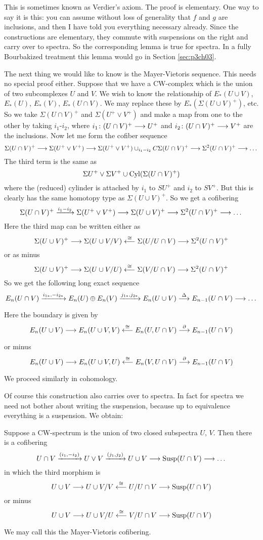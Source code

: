 \documentclass[../main]{subfiles}
\begin{document}
This is sometimes known as Verdier's axiom. The proof is elementary. One way to say it is this: you can assume without loss of generality that $f$ and $g$ are inclusions, and then I have told you everything necessary already. Since the constructions are elementary, they commute with suspensions on the right and carry over to spectra. So the corresponding lemma is true for spectra. In a fully Bourbakized treatment this lemma would go in Section \ref{sec:p3ch03}. 

The next thing we would like to know is the Mayer-Vietoris sequence. This needs no special proof either. Suppose that we have a CW-complex which is the union of two subcomplexes $U$ and $V$. We wish to know the relationship of $E_\ast(U\cup V)$, $E_\ast(U)$, $E_\ast(V)$, $E_\ast(U\cap V)$. We may replace these by $E_\ast(\Sigma (U\cup V)^+)$, etc. So we take $\Sigma (U\cap V)^+$ and $\Sigma (U^+\vee V^+)$ and make a map from one to the other by taking $i_1$-$i_2$, where $i_1\colon (U\cap V)^+\longrightarrow U^+$ and $i_2\colon (U\cap V)^+\longrightarrow V^+$ are the inclusions. Now let me form the cofiber sequence
\[\Sigma (U\cap V)^+ \longrightarrow \Sigma (U^+\vee V^+) \longrightarrow \Sigma (U^+\vee V^+)\cup_{i_1-i_2} C\Sigma (U\cap V)^+ \longrightarrow \Sigma^2(U\cap V)^+\longrightarrow\dots\]
The third term is the same as
\[\Sigma U^+\vee \Sigma V^+\cup \mathrm{Cyl}(\Sigma(U\cap V)^+)\]
where the (reduced) cylinder is attached by $i_1$ to $SU^+$ and $i_2$ to $SV^+$. But this is clearly has the same homotopy type as $\Sigma(U\cup V)^+$. So we get a cofibering
\[\Sigma(U\cap V)^+ \vra{i_1-i_2} \Sigma(U^+\vee V^+) \lra \Sigma(U\cup V)^+ \lra \Sigma^2(U\cap V)^+\lra\dots\]
Here the third map can be written either as
\[\Sigma(U\cup V)^+\longrightarrow \Sigma(U\cup V/V) \overset{\cong}{\longleftarrow} \Sigma(U/U\cap V)\longrightarrow \Sigma^2(U\cap V)^+\]
or as minus
\[\Sigma(U\cup V)^+\longrightarrow \Sigma(U\cup V/U) \overset{\cong}{\longleftarrow} \Sigma(V/U\cap V)\longrightarrow \Sigma^2(U\cap V)^+\]
So we get the following long exact sequence
\[E_n(U\cap V)\vra{i_{1\ast}, -i_{2\ast}} E_n(U)\oplus E_n(V) \vra{j_{1\ast}, j_{2\ast}} E_n(U\cup V)\vra{\Delta}E_{n-1}(U\cap V) \lra \dots\]
Here the boundary is given by
\[E_n(U\cup V) \lra E_n(U\cup V, V) \lal{\cong}E_n(U, U\cap V)\vra{\partial} E_{n-1}(U\cap V)\]
or minus
\[E_n(U\cup V) \lra E_n(U\cup V, U) \lal{\cong}E_n(V, U\cap V)\vra{\partial} E_{n-1}(U\cap V)\]
We proceed similarly in cohomology.

Of course this construction also carries over to spectra. In fact for spectra we need not bother about writing the suspension, because up to equivalence everything is a suspension. We obtain:
\begin{lemma}\label{lem:p3c06.9}
Suppose a CW-spectrum is the union of two closed subspectra $U$, $V$. Then there is a cofibering
\[U\cap V\vra{(i_1, -i_2)}U\vee V \vra{(j_1, j_2)}U\cup V\lra \te{Susp}(U\cap V)\lra \dots\]
in which the third morphism is
\[U\cup V\longrightarrow U\cup V/V\overset{\cong}{\longleftarrow}U/U\cap V\longrightarrow \mathrm{Susp}(U\cap V)\]
or minus
\[U\cup V\longrightarrow U\cup V/U\overset{\cong}{\longleftarrow}V/U\cap V\longrightarrow \mathrm{Susp}(U\cap V)\]
\end{lemma}
We may call this the Mayer-Vietoris cofibering.
\end{document}
